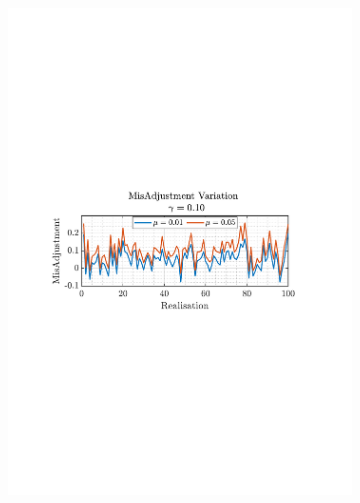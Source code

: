 \documentclass[12pt]{article}
\begin{document}
			\begin{figure}[H]
				\centering
				\begin{subfigure}{0.49\textwidth}
					\centering
					\includegraphics[trim={2.2cm 11.2cm 3.00cm  11.2cm}, clip, width=\textwidth]{../MATLAB/figures/q2_1f_fig01.pdf} 
					\captionsetup{justification=centering}
				\end{subfigure}
				\begin{subfigure}{0.49\textwidth}
					\centering

\end{subfigure}
\end{figure}
\end{document}
